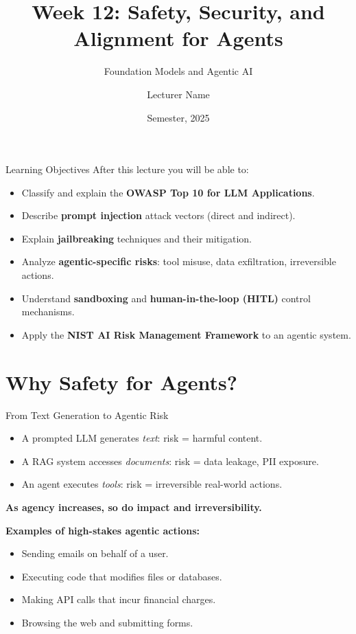 \documentclass[aspectratio=169,10pt]{beamer}
\title{Week 12: Safety, Security, and Alignment for Agents}
\subtitle{Foundation Models and Agentic AI}
\author{Lecturer Name}
\institute{Holon Institute of Technology (HIT)}
\date{Semester, 2025}
\begin{document}
\begin{frame}
  \titlepage
\end{frame}

\begin{frame}{Learning Objectives}
  After this lecture you will be able to:
  \begin{itemize}
    \item Classify and explain the \textbf{OWASP Top 10 for LLM Applications}.
    \item Describe \textbf{prompt injection} attack vectors (direct and indirect).
    \item Explain \textbf{jailbreaking} techniques and their mitigation.
    \item Analyze \textbf{agentic-specific risks}: tool misuse, data exfiltration, irreversible actions.
    \item Understand \textbf{sandboxing} and \textbf{human-in-the-loop (HITL)} control mechanisms.
    \item Apply the \textbf{NIST AI Risk Management Framework} to an agentic system.
  \end{itemize}
\end{frame}

\section{Why Safety for Agents?}

\begin{frame}{From Text Generation to Agentic Risk}
  \begin{tcolorbox}[alertbox, title=The Agentic Risk Escalation]
    \begin{itemize}
      \item A prompted LLM generates \emph{text}: risk = harmful content.
      \item A RAG system accesses \emph{documents}: risk = data leakage, PII exposure.
      \item An agent executes \emph{tools}: risk = irreversible real-world actions.
    \end{itemize}
    \textbf{As agency increases, so do impact and irreversibility.}
  \end{tcolorbox}
  \vspace{0.4em}
  \textbf{Examples of high-stakes agentic actions:}
  \begin{itemize}
    \item Sending emails on behalf of a user.
    \item Executing code that modifies files or databases.
    \item Making API calls that incur financial charges.
    \item Browsing the web and submitting forms.
  \end{itemize}
\end{frame}
\end{document}

